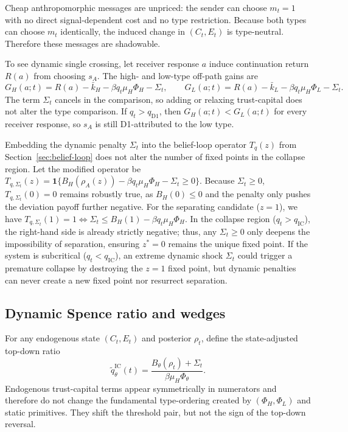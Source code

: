 Cheap anthropomorphic messages are unpriced: the sender can choose $m_t=1$ with no direct signal-dependent cost and no type restriction. Because both types can choose $m_t$ identically, the induced change in $(C_t,E_t)$ is type-neutral. Therefore these messages are shadowable.

To see dynamic single crossing, let receiver response $a$ induce continuation return $R(a)$ from choosing $s_A$. The high- and low-type off-path gains are
\[
G_H(a;t)=R(a)-\bar k_H-\beta q_t\mu_H\Phi_H-\Sigma_t,
\qquad
G_L(a;t)=R(a)-\bar k_L-\beta q_t\mu_H\Phi_L-\Sigma_t.
\]
The term $\Sigma_t$ cancels in the comparison, so adding or relaxing trust-capital does not alter the type comparison. If $q_t>q_{\mathrm{D1}}$, then $G_H(a;t)<G_L(a;t)$ for every receiver response, so $s_A$ is still D1-attributed to the low type.

\begin{remark}
Embedding the dynamic penalty $\Sigma_t$ into the belief-loop operator $T_q(z)$ from Section~\ref{sec:belief-loop} does not alter the number of fixed points in the collapse region. Let the modified operator be $T_{q,\Sigma_t}(z) = \mathbf{1}\{B_H(\rho_A(z)) - \beta q_t \mu_H \Phi_H - \Sigma_t \ge 0\}$. Because $\Sigma_t \ge 0$, $T_{q,\Sigma_t}(0) = 0$ remains robustly true, as $B_H(0) \le 0$ and the penalty only pushes the deviation payoff further negative. For the separating candidate ($z=1$), we have $T_{q,\Sigma_t}(1) = 1 \iff \Sigma_t \le B_H(1) - \beta q_t \mu_H \Phi_H$. In the collapse region ($q_t > q_{\mathrm{IC}}$), the right-hand side is already strictly negative; thus, any $\Sigma_t \ge 0$ only deepens the impossibility of separation, ensuring $z^*=0$ remains the unique fixed point. If the system is subcritical ($q_t < q_{\mathrm{IC}}$), an extreme dynamic shock $\Sigma_t$ could trigger a premature collapse by destroying the $z=1$ fixed point, but dynamic penalties can never create a new fixed point nor resurrect separation.
\end{remark}

\subsection{Dynamic Spence ratio and wedges}

For any endogenous state $(C_t,E_t)$ and posterior $\rho_t$, define the state-adjusted top-down ratio
\[
\widetilde q^{\mathrm{IC}}_\theta(t)=\frac{B_\theta(\rho_t)+\Sigma_t}{\beta\mu_H\Phi_\theta}.
\]
Endogenous trust-capital terms appear symmetrically in numerators and therefore do not change the fundamental type-ordering created by $(\Phi_H,\Phi_L)$ and static primitives. They shift the threshold pair, but not the sign of the top-down reversal.

